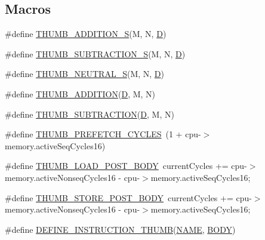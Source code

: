 \subsection*{Macros}
\begin{DoxyCompactItemize}
\item 
\#define \mbox{\hyperlink{isa-thumb_8c_a9f1a491535a7a9979d9a32cc97feb29b}{T\+H\+U\+M\+B\+\_\+\+A\+D\+D\+I\+T\+I\+O\+N\+\_\+S}}(M,  N,  \mbox{\hyperlink{_aes_8c_adef282f11138cda3d081cc21280a8d12}{D}})
\item 
\#define \mbox{\hyperlink{isa-thumb_8c_a964e088efd4388ebafddbcd1572ce737}{T\+H\+U\+M\+B\+\_\+\+S\+U\+B\+T\+R\+A\+C\+T\+I\+O\+N\+\_\+S}}(M,  N,  \mbox{\hyperlink{_aes_8c_adef282f11138cda3d081cc21280a8d12}{D}})
\item 
\#define \mbox{\hyperlink{isa-thumb_8c_a30bedc7922ec18fb0276d5f67b7abee8}{T\+H\+U\+M\+B\+\_\+\+N\+E\+U\+T\+R\+A\+L\+\_\+S}}(M,  N,  \mbox{\hyperlink{_aes_8c_adef282f11138cda3d081cc21280a8d12}{D}})
\item 
\#define \mbox{\hyperlink{isa-thumb_8c_ad793558cdf582a81560be39e66738aa7}{T\+H\+U\+M\+B\+\_\+\+A\+D\+D\+I\+T\+I\+ON}}(\mbox{\hyperlink{_aes_8c_adef282f11138cda3d081cc21280a8d12}{D}},  M,  N)
\item 
\#define \mbox{\hyperlink{isa-thumb_8c_a441cc37cc432849325c84952f3f0d7a7}{T\+H\+U\+M\+B\+\_\+\+S\+U\+B\+T\+R\+A\+C\+T\+I\+ON}}(\mbox{\hyperlink{_aes_8c_adef282f11138cda3d081cc21280a8d12}{D}},  M,  N)
\item 
\#define \mbox{\hyperlink{isa-thumb_8c_a85b1271971728be0c5ad770f9fb34d32}{T\+H\+U\+M\+B\+\_\+\+P\+R\+E\+F\+E\+T\+C\+H\+\_\+\+C\+Y\+C\+L\+ES}}~(1 + cpu-\/$>$memory.\+active\+Seq\+Cycles16)
\item 
\#define \mbox{\hyperlink{isa-thumb_8c_af849c1ee0059b114cd464e7f3c31e6f0}{T\+H\+U\+M\+B\+\_\+\+L\+O\+A\+D\+\_\+\+P\+O\+S\+T\+\_\+\+B\+O\+DY}}~current\+Cycles += cpu-\/$>$memory.\+active\+Nonseq\+Cycles16 -\/ cpu-\/$>$memory.\+active\+Seq\+Cycles16;
\item 
\#define \mbox{\hyperlink{isa-thumb_8c_a7591153e2a1283bd25a8d81689ab4435}{T\+H\+U\+M\+B\+\_\+\+S\+T\+O\+R\+E\+\_\+\+P\+O\+S\+T\+\_\+\+B\+O\+DY}}~current\+Cycles += cpu-\/$>$memory.\+active\+Nonseq\+Cycles16 -\/ cpu-\/$>$memory.\+active\+Seq\+Cycles16;
\item 
\#define \mbox{\hyperlink{isa-thumb_8c_aca0a4c9b536fe9f14f89105945cfeb3d}{D\+E\+F\+I\+N\+E\+\_\+\+I\+N\+S\+T\+R\+U\+C\+T\+I\+O\+N\+\_\+\+T\+H\+U\+MB}}(\mbox{\hyperlink{inflate_8h_a164ea0159d5f0b5f12a646f25f99eceaa67bc2ced260a8e43805d2480a785d312}{N\+A\+ME}},  \mbox{\hyperlink{gzlog_8c_aa6bdf6a6d9916c343e1e17774d84a156}{B\+O\+DY}})

\end{DoxyCompactItemize}
